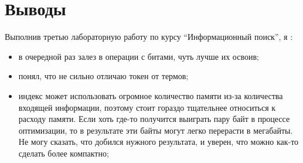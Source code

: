 \section{Выводы}

Выполнив третью лабораторную работу по курсу \enquote{Информационный поиск}, я :
\begin{itemize}
    \item в очередной раз залез в операции с битами, чуть лучше их освоив;
    \item понял, что не сильно отличаю токен от термов;
    \item индекс может использовать огромное количество памяти из-за количества входящей информации, поэтому стоит гораздо тщательнее относиться к расходу памяти. Если хоть где-то получится выиграть пару байт в процессе оптимизации, то в результате эти байты могут легко перерасти в мегабайты. Не могу сказать, что добился нужного результата, и уверен, что можно как-то сделать более компактно;
\end{itemize}
\pagebreak
